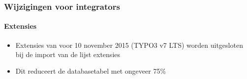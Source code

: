 
\begin{frame}[fragile]
	\frametitle{Wijzigingen voor integrators}
	\framesubtitle{Extensies}

	\begin{itemize}
		\item Extensies van voor 10 november 2015 (TYPO3 v7 LTS) worden uitgesloten
			bij de import van de lijst extensies
		\item Dit reduceert de databasetabel met ongeveer 75\%
	\end{itemize}

\end{frame}

